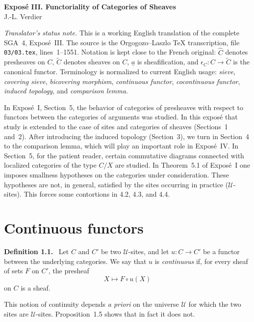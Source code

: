 \documentclass[11pt]{article}
\newcommand{\U}{\mathcal{U}}
\newenvironment{statement}[1]{\par\medskip\noindent\textbf{#1.}\ }{\par\medskip}
\begin{document}
\begin{center}
{\Large \textbf{Expos\'e III. Functoriality of Categories of Sheaves}}\\[0.35em]
J.-L. Verdier
\end{center}

\bigskip

\noindent\emph{Translator's status note.} This is a working English translation of the complete SGA~4, Expos\'e~III. The source is the Orgogozo--Laszlo TeX transcription, file \texttt{03/03.tex}, lines~1--1551. Notation is kept close to the French original: \(\widehat C\) denotes presheaves on \(C\), \(\widetilde C\) denotes sheaves on \(C\), \(\underline a\) is sheafification, and \(\epsilon_C:C\to\widetilde C\) is the canonical functor. Terminology is normalized to current English usage: \emph{sieve}, \emph{covering sieve}, \emph{bicovering morphism}, \emph{continuous functor}, \emph{cocontinuous functor}, \emph{induced topology}, and \emph{comparison lemma}.

\medskip

In Expos\'e~I, Section~5, the behavior of categories of presheaves with respect to functors between the categories of arguments was studied. In this expos\'e that study is extended to the case of sites and categories of sheaves (Sections~1 and~2). After introducing the induced topology (Section~3), we turn in Section~4 to the comparison lemma, which will play an important role in Expos\'e~IV. In Section~5, for the patient reader, certain commutative diagrams connected with localized categories of the type \(C/X\) are studied. In Theorem~5.1 of Expos\'e~I one imposes smallness hypotheses on the categories under consideration. These hypotheses are not, in general, satisfied by the sites occurring in practice (\(\U\)-sites). This forces some contortions in 4.2, 4.3, and 4.4.

\section{Continuous functors}

\begin{statement}{Definition 1.1}
Let \(C\) and \(C'\) be two \(\U\)-sites, and let \(u:C\to C'\) be a functor between the underlying categories. We say that \(u\) is \emph{continuous} if, for every sheaf of sets \(F\) on \(C'\), the presheaf
\[
X\longmapsto F\circ u(X)
\]
on \(C\) is a sheaf.
\end{statement}

This notion of continuity depends \emph{a priori} on the universe \(\U\) for which the two sites are \(\U\)-sites. Proposition~1.5 shows that in fact it does not.
\end{document}
